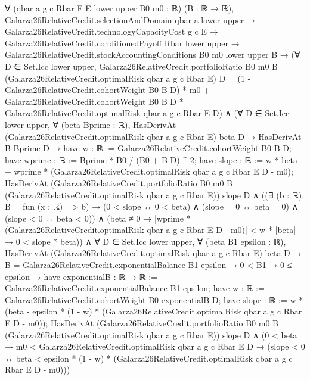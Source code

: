 \documentclass[10pt]{article}
\begin{document}
\begin{ReviewVerbatim}
∀ (qbar a g c Rbar F E lower upper B0 m0 : ℝ) (B : ℝ → ℝ),
  Galarza26RelativeCredit.selectionAndDomain qbar a lower upper →
    Galarza26RelativeCredit.technologyCapacityCost g c E →
      Galarza26RelativeCredit.conditionedPayoff Rbar lower upper →
        Galarza26RelativeCredit.stockAccountingConditions B0 m0 lower upper B →
          (∀ D ∈ Set.Icc lower upper,
              Galarza26RelativeCredit.portfolioRatio B0 m0 B (Galarza26RelativeCredit.optimalRisk qbar a g c Rbar E) D =
                (1 - Galarza26RelativeCredit.cohortWeight B0 B D) * m0 +
                  Galarza26RelativeCredit.cohortWeight B0 B D *
                    Galarza26RelativeCredit.optimalRisk qbar a g c Rbar E D) ∧
            (∀ D ∈ Set.Icc lower upper,
                ∀ (beta Bprime : ℝ),
                  HasDerivAt (Galarza26RelativeCredit.optimalRisk qbar a g c Rbar E) beta D →
                    HasDerivAt B Bprime D →
                      have w : ℝ := Galarza26RelativeCredit.cohortWeight B0 B D;
                      have wprime : ℝ := Bprime * B0 / (B0 + B D) ^ 2;
                      have slope : ℝ :=
                        w * beta + wprime * (Galarza26RelativeCredit.optimalRisk qbar a g c Rbar E D - m0);
                      HasDerivAt
                          (Galarza26RelativeCredit.portfolioRatio B0 m0 B
                            (Galarza26RelativeCredit.optimalRisk qbar a g c Rbar E))
                          slope D ∧
                        ((∃ (b : ℝ), B = fun (x : ℝ) => b) →
                            (0 < slope ↔ 0 < beta) ∧ (slope = 0 ↔ beta = 0) ∧ (slope < 0 ↔ beta < 0)) ∧
                          (beta ≠ 0 →
                            |wprime * (Galarza26RelativeCredit.optimalRisk qbar a g c Rbar E D - m0)| < w * |beta| →
                              0 < slope * beta)) ∧
              ∀ D ∈ Set.Icc lower upper,
                ∀ (beta B1 epsilon : ℝ),
                  HasDerivAt (Galarza26RelativeCredit.optimalRisk qbar a g c Rbar E) beta D →
                    B = Galarza26RelativeCredit.exponentialBalance B1 epsilon →
                      0 < B1 →
                        0 ≤ epsilon →
                          have exponentialB : ℝ → ℝ := Galarza26RelativeCredit.exponentialBalance B1 epsilon;
                          have w : ℝ := Galarza26RelativeCredit.cohortWeight B0 exponentialB D;
                          have slope : ℝ :=
                            w *
                              (beta -
                                epsilon * (1 - w) * (Galarza26RelativeCredit.optimalRisk qbar a g c Rbar E D - m0));
                          HasDerivAt
                              (Galarza26RelativeCredit.portfolioRatio B0 m0 B
                                (Galarza26RelativeCredit.optimalRisk qbar a g c Rbar E))
                              slope D ∧
                            (0 < beta →
                              m0 < Galarza26RelativeCredit.optimalRisk qbar a g c Rbar E D →
                                (slope < 0 ↔
                                  beta <
                                    epsilon * (1 - w) * (Galarza26RelativeCredit.optimalRisk qbar a g c Rbar E D - m0)))
\end{ReviewVerbatim}
\end{document}
